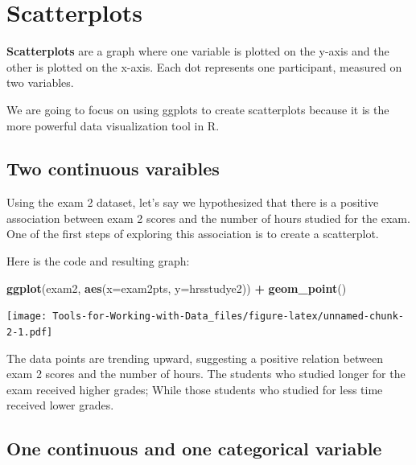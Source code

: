 \documentclass[
]{book}
\newenvironment{Shaded}{\begin{snugshade}}{\end{snugshade}}
\newcommand{\DataTypeTok}[1]{\textcolor[rgb]{0.13,0.29,0.53}{#1}}
\newcommand{\KeywordTok}[1]{\textcolor[rgb]{0.13,0.29,0.53}{\textbf{#1}}}
\newcommand{\NormalTok}[1]{#1}
\newcommand{\OperatorTok}[1]{\textcolor[rgb]{0.81,0.36,0.00}{\textbf{#1}}}
\newcommand{\StringTok}[1]{\textcolor[rgb]{0.31,0.60,0.02}{#1}}
\begin{document}
\hypertarget{scatterplots}{%
\section{Scatterplots}\label{scatterplots}}

\textbf{Scatterplots} are a graph where one variable is plotted on the y-axis and the other is plotted on the x-axis. Each dot represents one participant, measured on two variables.

We are going to focus on using ggplots to create scatterplots because it is the more powerful data visualization tool in R.

\hypertarget{two-continuous-varaibles}{%
\subsection{Two continuous varaibles}\label{two-continuous-varaibles}}

Using the exam 2 dataset, let's say we hypothesized that there is a positive association between exam 2 scores and the number of hours studied for the exam. One of the first steps of exploring this association is to create a scatterplot.

Here is the code and resulting graph:

\begin{Shaded}
\begin{Highlighting}[]
\KeywordTok{ggplot}\NormalTok{(exam2, }\KeywordTok{aes}\NormalTok{(}\DataTypeTok{x=}\NormalTok{exam2pts, }\DataTypeTok{y=}\NormalTok{hrsstudye2)) }\OperatorTok{+}
\StringTok{  }\KeywordTok{geom_point}\NormalTok{()}
\end{Highlighting}
\end{Shaded}

\texttt{[image: Tools-for-Working-with-Data\_files/figure-latex/unnamed-chunk-2-1.pdf]}

The data points are trending upward, suggesting a positive relation between exam 2 scores and the number of hours. The students who studied longer for the exam received higher grades; While those students who studied for less time received lower grades.

\hypertarget{one-continuous-and-one-categorical-variable}{%
\subsection{One continuous and one categorical variable}\label{one-continuous-and-one-categorical-variable}}
\end{document}
